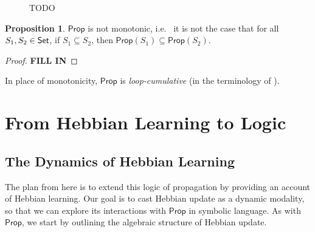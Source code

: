 \documentclass[letterpaper]{article}
\theoremstyle{definition}
\newtheorem{proposition}{Proposition}
\newcommand{\Set}{\mbox{\sf Set}}
\newcommand{\Prop}{\textsf{Prop}}
\begin{document}
\begin{figure}
{
}
\caption{\textcolor{myred}{TODO}}
\label{fig:monotonicity-counterexamples}
\end{figure}

\begin{proposition}
$\Prop$ is not monotonic, i.e.~ it is not the case that for all $S_1, S_2 \in \Set$, if $S_1 \subseteq S_2$, then $\Prop(S_1) \subseteq \Prop(S_2)$.
\end{proposition}
\begin{proof}
\textbf{\textcolor{myred}{FILL IN}}
\end{proof}

In place of monotonicity, $\Prop$ is \emph{loop-cumulative} (in the terminology of \citep{kraus1990nonmonotonic}).


\section{From Hebbian Learning to Logic}

\subsection{The Dynamics of Hebbian Learning}

The plan from here is to extend this logic of propagation by providing an account of Hebbian learning.  Our goal is to cast Hebbian update as a dynamic modality, so that we can explore its interactions with $\Prop$ in symbolic language.  As with $\Prop$, we start by outlining the algebraic structure of Hebbian update.
\end{document}
